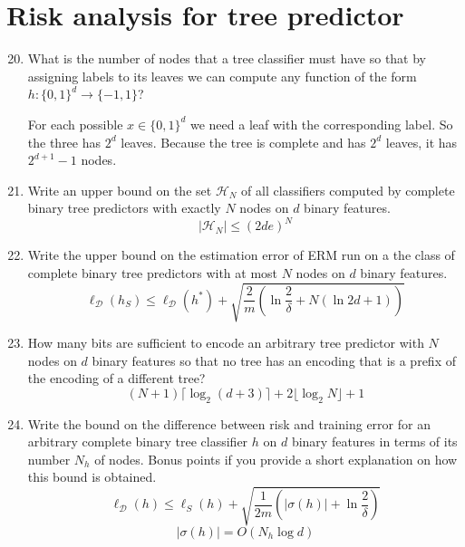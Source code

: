\documentclass[a4paper]{article}
\newcommand{\D}{\ensuremath{\mathcal{D}}}
\newcommand{\Hpred}{\ensuremath{\mathcal{H}}}
\begin{document}
\section{Risk analysis for tree predictor}
\begin{enumerate}
    \setcounter{enumi}{19}
    \item What is the number of nodes that a tree classifier must have so that by assigning labels 
    to its leaves we can compute any function of the form $h:\{0,1\}^d\to\{-1,1\}$?
    
    For each possible $x\in\{0,1\}^d$ we need a leaf with the corresponding label. So the three
    has $2^d$ leaves. Because the tree is complete and has $2^d$ leaves, it has $2^{d+1}-1$ nodes.
    \item Write an upper bound on the set $\Hpred_N$ of all classifiers computed by complete binary
    tree predictors with exactly $N$ nodes on $d$ binary features.
    $$ |\Hpred_N| \leq (2de)^N $$
    \item Write the upper bound on the estimation error of ERM run on a the class of complete binary
    tree predictors with at most $N$ nodes on $d$ binary features.
    $$ \ell_\D(h_S) \leq \ell_\D(h^*) + \sqrt{
        \frac{2}{m}\left(\ln{\frac{2}{\delta}+N\left(\ln{2d}+1\right)}\right)
    } $$
    \item How many bits are sufficient to encode an arbitrary tree predictor with $N$ nodes on $d$ 
    binary features so that no tree has an encoding that is a prefix of the encoding of a 
    different tree?
    $$ (N+1)\lceil\log_2{(d+3)}\rceil+2\lfloor\log_2{N}\rfloor+1 $$
    \item Write the bound on the difference between risk and training error for an arbitrary 
    complete binary tree classifier $h$ on $d$  binary features in terms of its number $N_h$ of nodes. 
    Bonus points if you provide a short explanation on how this bound is obtained.
    $$ \ell_\D(h)\leq\ell_S(h)+\sqrt{\frac{1}{2m}\left(|\sigma(h)|+\ln{\frac{2}{\delta}}\right)} $$
    $$ |\sigma(h)|=O(N_h\log{d}) $$
\end{enumerate}
\end{document}
